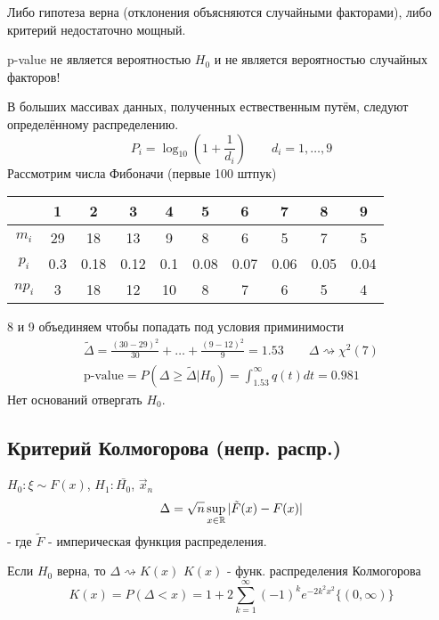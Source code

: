 \documentclass{article}
\begin{document}
\begin{eg}
\begin{remark}
\begin{enumerate}
      Либо гипотеза верна (отклонения объясняются случайными факторами),
      либо критерий недостаточно мощный.
  \end{enumerate}
  p-value не является вероятностью $H_0$ и не является вероятностью случайных факторов!
\end{remark}
\hr

\begin{eg}
  В больших массивах данных, полученных ествественным путём, следуют определённому распределению.
  \[
    P_i = \log_{10}(1+\frac{1}{d_i}) \qquad d_i=1,\dots ,9
  \]
  Рассмотрим числа Фибоначи (первые 100 штпук)
\end{eg}
\begin{center}
\begin{tabular}{| c | c | c | c | c | c | c| c | c | c |}
  \hline
  & 1 & 2 & 3 & 4 & 5 & 6 & 7 & 8 & 9 \\
  \hline
  $m_i$ & 29 & 18 & 13 & 9 & 8 & 6 & 5 & 7 & 5 \\
  \hline
  $p_i$ & 0.3 & 0.18 & 0.12 & 0.1 & 0.08 & 0.07 & 0.06 & 0.05 & 0.04 \\ 
  \hline
  $np_i$ & 3 & 18 & 12 & 10 & 8 & 7 & 6 & 5 & 4 \\ 
  \hline
\end{tabular}
\end{center}
8 и 9 объединяем чтобы попадать под условия приминимости
\begin{gather*}
  \tilde{\Delta} = \frac{(30-29)^{2}}{30} + \dots + \frac{(9-12)^{2}}{9}=1.53 \qquad \Delta \rightsquigarrow \chi^{2}(7) \\ 
  \text{p-value}=P(\Delta \ge \tilde{\Delta} | H_0)=\int_{1.53}^{\infty}q(t)dt=0.981
\end{gather*}
Нет оснований отвергать $H_0$.
\end{eg}

\subsection{Критерий Колмогорова (непр. распр.)}
$H_0:\xi \sim F(x)$, $H_1:\bar{H_0}$, $\vec{x}_n$
\[
  \Delta = \sqrt{n}\sup \limits_{x\in\mathbb{R}} |\tilde{F}(x)-F(x)|
\]
- где $\tilde{F}$ - империческая функция распределения.
\begin{theorem}
  Если $H_0$ верна, то $\Delta \rightsquigarrow K(x)$
  $K(x)$ - функ. распределения Колмогорова
  \[
    K(x)=P(\Delta<x)=1+2\sum_{k=1}^{\infty}(-1)^{k}e^{-2k^{2}x^{2}}\{(0, \infty)\}
  \]
\end{theorem}
\end{document}
